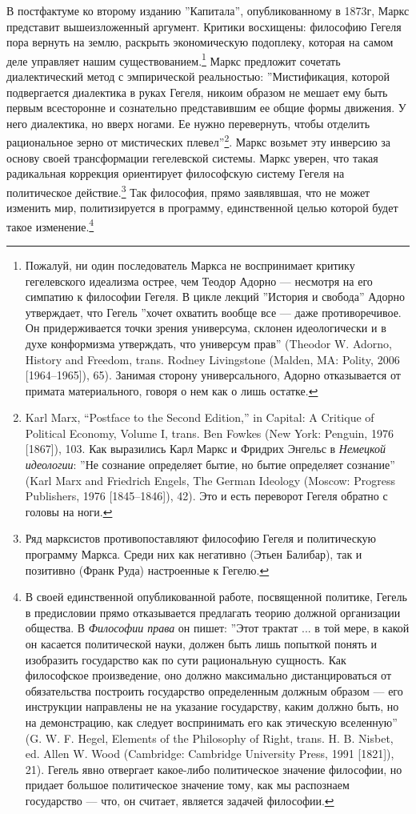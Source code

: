 \documentclass[12pt]{book}
\begin{document}
В постфактуме ко второму изданию ''Капитала'', опубликованному в 1873г, Маркс представит вышеизложенный аргумент. Критики восхищены: философию Гегеля пора вернуть на землю, раскрыть экономическую подоплеку, которая на самом деле управляет нашим существованием.\footnote{Пожалуй, ни один последователь Маркса не воспринимает критику гегелевского идеализма острее, чем Теодор Адорно --- несмотря на его симпатию к философии Гегеля. В цикле лекций ''История и свобода'' Адорно утверждает, что Гегель ''хочет охватить вообще все --- даже противоречивое. Он придерживается точки зрения универсума, склонен идеологически и в духе конформизма утверждать, что универсум прав'' (Theodor W. Adorno, History and Freedom, trans. Rodney Livingstone (Malden, MA: Polity, 2006 [1964–1965]), 65). Занимая сторону универсального, Адорно отказывается от примата материального, говоря о нем как о лишь остатке.} Маркс предложит сочетать диалектический метод с эмпирической реальностью: ''Мистификация, которой подвергается диалектика в руках Гегеля, никоим образом не мешает ему быть первым всесторонне и сознательно представившим ее общие формы движения. У него диалектика, но вверх ногами. Ее нужно перевернуть, чтобы отделить рациональное зерно от мистических плевел''\footnote{Karl Marx, “Postface to the Second Edition,” in Capital: A Critique of Political Economy, Volume I, trans. Ben Fowkes (New York: Penguin, 1976 [1867]), 103. Как выразились Карл Маркс и Фридрих Энгельс в \textit{Немецкой идеологии}: ''Не сознание определяет бытие, но бытие определяет сознание'' (Karl Marx and Friedrich Engels, The German Ideology (Moscow: Progress Publishers, 1976 [1845–1846]), 42). Это и есть переворот Гегеля обратно с головы на ноги.}. Маркс возьмет эту инверсию за основу своей трансформации гегелевской системы. Маркс уверен, что такая радикальная коррекция ориентирует философскую систему Гегеля на политическое действие.\footnote{Ряд марксистов противопоставляют философию Гегеля и политическую программу Маркса. Среди них как негативно (Этьен Балибар), так и позитивно (Франк Руда) настроенные к Гегелю.} Так философия, прямо заявлявшая, что не может изменить мир, политизируется в программу, единственной целью которой будет такое изменение.\footnote{В своей единственной опубликованной работе, посвященной политике, Гегель в предисловии прямо отказывается предлагать теорию должной организации общества. В \textit{Философии права} он пишет: ''Этот трактат ... в той мере, в какой он касается политической науки, должен быть лишь попыткой понять и изобразить государство как по сути рациональную сущность. Как философское произведение, оно должно максимально дистанцироваться от обязательства построить государство определенным должным образом --- его инструкции направлены не на указание государству, каким должно быть, но на демонстрацию, как следует воспринимать его как этическую вселенную'' (G. W. F. Hegel, Elements of the Philosophy of Right, trans. H. B. Nisbet, ed. Allen W. Wood (Cambridge: Cambridge University Press, 1991 [1821]), 21). Гегель явно отвергает какое-либо политическое значение философии, но придает большое политическое значение тому, как мы распознаем государство --- что, он считает, является задачей философии.}
\end{document}
